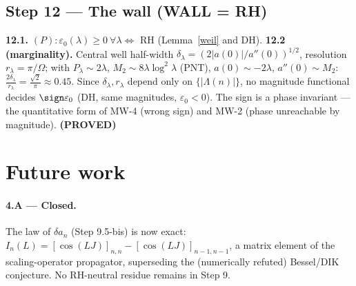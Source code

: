 \documentclass[11pt]{article}
\theoremstyle{remark}
\newcommand{\ve}{\varepsilon}
\newcommand{\PROVED}{\textbf{(PROVED)}}
\newcommand{\WALL}{\textbf{(WALL = RH)}}
\begin{document}
\subsection{Step 12 --- The wall \WALL}

\textbf{12.1.} $(P):\ve_0(\lambda)\ge0\ \forall\lambda\iff$ RH (Lemma~\ref{weil} and DH).
\textbf{12.2 (marginality).} Central well half-width $\delta_\lambda=(2|a(0)|/a''(0))^{1/2}$,
resolution $r_\lambda=\pi/\Omega$; with $P_\lambda\sim2\lambda$,
$M_2\sim8\lambda\log^2\lambda$ (PNT), $a(0)\sim-2\lambda$, $a''(0)\sim M_2$:
$\frac{2\delta_\lambda}{r_\lambda}=\frac{\sqrt2}{\pi}\approx0.45$. Since $\delta_\lambda,r_\lambda$
depend only on $\{|\Lambda(n)|\}$, no magnitude functional decides $\sign\ve_0$ (DH,
same magnitudes, $\ve_0<0$). The sign is a phase invariant --- the quantitative form of MW-4
(wrong sign) and MW-2 (phase unreachable by magnitude). \PROVED

\section{Future work}
\paragraph{4.A --- Closed.} The law of $\delta a_n$ (Step 9.5-bis) is now exact:
$I_n(L)=[\cos(LJ)]_{n,n}-[\cos(LJ)]_{n-1,n-1}$, a matrix element of the scaling-operator
propagator, superseding the (numerically refuted) Bessel/DIK conjecture. No RH-neutral residue
remains in Step 9.
\end{document}
